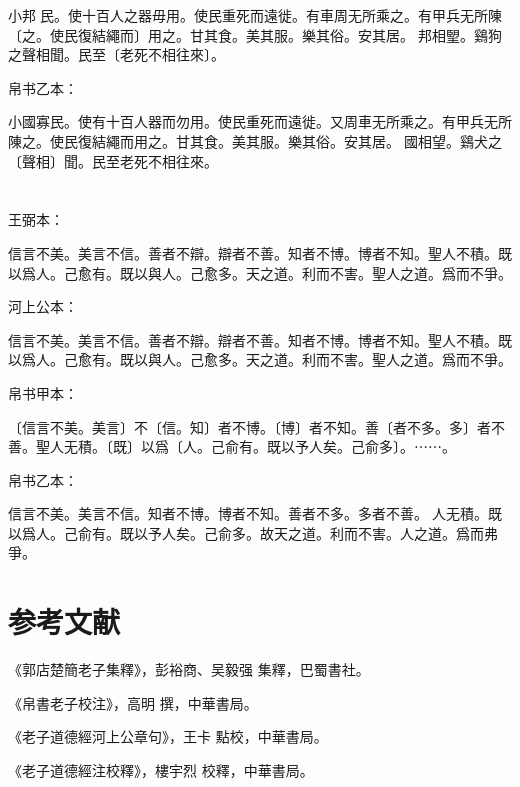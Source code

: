 \documentclass[a5paper]{ctexbook}
\begin{document}
    小邦󱁈民。使十百人之器毋用。使民重死而遠徙。有車周无所乘之。有甲兵无所陳〔之。使民復結繩而〕用之。甘其食。美其服。樂其俗。安其居。󱁉邦相朢。鷄狗之聲相聞。民至〔老死不相往來〕。

    帛书乙本：

    小國寡民。使有十百人器而勿用。使民重死而遠徙。又周車无所乘之。有甲兵无所陳之。使民復結繩而用之。甘其食。美其服。樂其俗。安其居。𠳵國相望。鷄犬之〔聲相〕聞。民至老死不相往來。

    \chapter{}
    王弼本：

    信言不美。美言不信。善者不辯。辯者不善。知者不博。博者不知。聖人不積。既以爲人。己愈有。既以與人。己愈多。天之道。利而不害。聖人之道。爲而不爭。

    河上公本：

    信言不美。美言不信。善者不辯。辯者不善。知者不博。博者不知。聖人不積。既以爲人。己愈有。既以與人。己愈多。天之道。利而不害。聖人之道。爲而不爭。

    帛书甲本：

    〔信言不美。美言〕不〔信。知〕者不博。〔博〕者不知。善〔者不多。多〕者不善。聖人无積。〔既〕以爲〔人。己俞有。既以予人矣。己俞多〕。⋯⋯。

    帛书乙本：

    信言不美。美言不信。知者不博。博者不知。善者不多。多者不善。𦔻人无積。既以爲人。己俞有。既以予人矣。己俞多。故天之道。利而不害。人之道。爲而弗爭。

    \chapter*{参考文献}
    《郭店楚簡老子集釋》，彭裕商、吴毅强 集釋，巴蜀書社。

    《帛書老子校注》，高明 撰，中華書局。

    《老子道德經河上公章句》，王卡 點校，中華書局。

    《老子道德經注校釋》，樓宇烈 校釋，中華書局。
\end{document}
